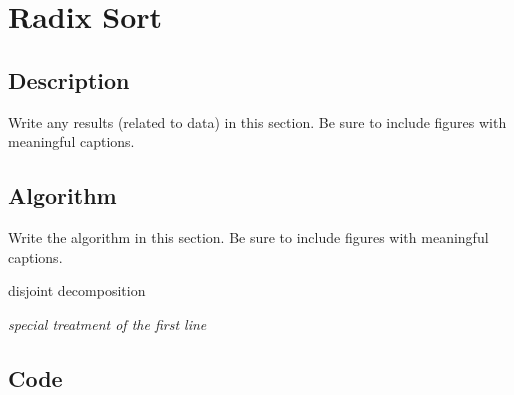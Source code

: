 \pagebreak

\section{Radix Sort}

\subsection{Description}
Write any results (related to data) in this section. Be sure to include figures with meaningful captions.


\subsection{Algorithm}
Write the algorithm in this section. Be sure to include figures with meaningful captions.

\begin{algorithm}
    \caption{disjoint decomposition}
    \BlankLine
    \emph{special treatment of the first line}\;
    \label{algo_disjdecomp}
\end{algorithm}

\subsection{Code}

